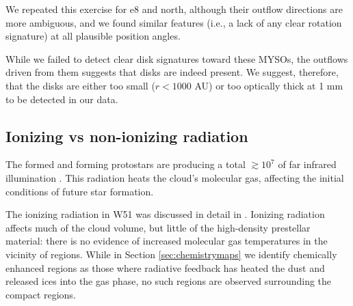 \documentclass[twocolumn]{aastex61}
\begin{document}
We repeated this exercise for e8 and north, although their outflow directions
are more ambiguous, and we found similar features (i.e., a lack of any clear
rotation signature) at all plausible position angles.

While we failed to detect clear disk signatures toward these MYSOs, the
outflows driven from them suggests that disks are indeed present.  We suggest,
therefore, that the disks are either too small ($r<1000$ AU) or too optically
thick at 1 mm to be detected in our data.





\subsection{Ionizing vs non-ionizing radiation}
\label{sec:nonionizingradiation}
The formed and forming protostars are producing a total $\gtrsim10^7$ \lsun of
far infrared illumination \citep{Ginsburg2016b}.  This radiation heats the
cloud's molecular gas, affecting the initial conditions of future star
formation.

The ionizing radiation in W51 was discussed in detail in \citet{Ginsburg2016b}.
Ionizing radiation affects much of the cloud volume, but little of the
high-density prestellar material:  there is no evidence of increased molecular gas
temperatures in the vicinity of \hii regions.  While in Section
\ref{sec:chemistrymaps} we identify chemically enhanced regions as those where
radiative feedback has heated the dust and released ices into the gas phase, no
such regions are observed surrounding the compact \hii regions.

\end{document}
